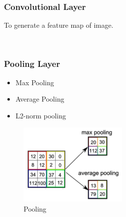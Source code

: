 \documentclass{tron}
\begin{document}
\subsubsection{Convolutional Layer}
To generate a feature map of image.
\begin{figure}[H]
	\center
	\\
\end{figure}

\subsubsection{Pooling Layer}
\begin{remark}[Types]{}
\begin{itemize}
	\item Max Pooling
	\item Average Pooling
	\item L2-norm pooling
\end{itemize}
\begin{figure}[H]
	\center
	\includegraphics[width=200px]{Figs/CNN/pooling}
	\caption{Pooling}
\end{figure}
\end{remark}
\end{document}
